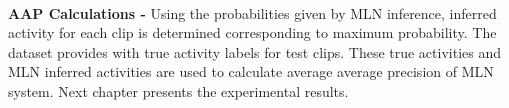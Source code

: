 \begin{comment}
Sample inference instance looks like
\begin{equation}
	\begin{split}
		~ & ActivityConf\_P1\_TO\_P15(``actioncliptest00001",``Kiss") \\
		~ & ActivityConf\_N2\_TO\_N15(``actioncliptest00002",``Eat") \\
		~ & ObjPresent(``actioncliptest00001",``person") \\
		~ & ObjPresent(``actioncliptest00002",``person") \\
		~ & NumPersons\_2\_TO\_I(``actioncliptest00001") \\
		~ & NumPersons\_1\_TO\_15(``actioncliptest00002") \\
		~ & \vdots
	\end{split}
\end{equation}
\end{comment}

~ \\
{\bf AAP Calculations - }Using the probabilities given by MLN inference, inferred activity for each
clip is determined corresponding to maximum probability. The dataset provides with true activity labels for test clips. 
These true activities and MLN inferred activities are used to calculate average average precision
of MLN system. Next chapter presents the experimental results.

